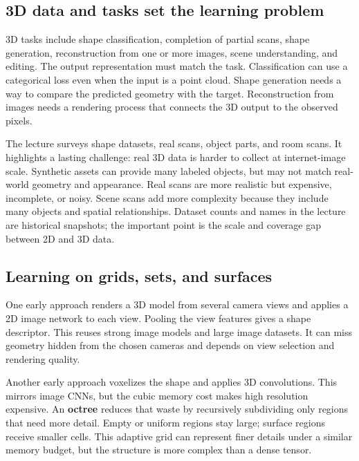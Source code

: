 \subsection{3D data and tasks set the learning problem}\label{04-visual-computing-ii-ch034-d-data-and-tasks-set-the-learning-problem}

3D tasks include shape classification, completion of partial scans, shape generation, reconstruction from one or more images, scene understanding, and editing. The output representation must match the task. Classification can use a categorical loss even when the input is a point cloud. Shape generation needs a way to compare the predicted geometry with the target. Reconstruction from images needs a rendering process that connects the 3D output to the observed pixels.

The lecture surveys shape datasets, real scans, object parts, and room scans. It highlights a lasting challenge: real 3D data is harder to collect at internet-image scale. Synthetic assets can provide many labeled objects, but may not match real-world geometry and appearance. Real scans are more realistic but expensive, incomplete, or noisy. Scene scans add more complexity because they include many objects and spatial relationships. Dataset counts and names in the lecture are historical snapshots; the important point is the scale and coverage gap between 2D and 3D data.

\subsection{Learning on grids, sets, and surfaces}\label{04-visual-computing-ii-ch034-learning-on-grids-sets-and-surfaces}

One early approach renders a 3D model from several camera views and applies a 2D image network to each view. Pooling the view features gives a shape descriptor. This reuses strong image models and large image datasets. It can miss geometry hidden from the chosen cameras and depends on view selection and rendering quality.

Another early approach voxelizes the shape and applies 3D convolutions. This mirrors image CNNs, but the cubic memory cost makes high resolution expensive. An \textbf{octree} reduces that waste by recursively subdividing only regions that need more detail. Empty or uniform regions stay large; surface regions receive smaller cells. This adaptive grid can represent finer details under a similar memory budget, but the structure is more complex than a dense tensor.

